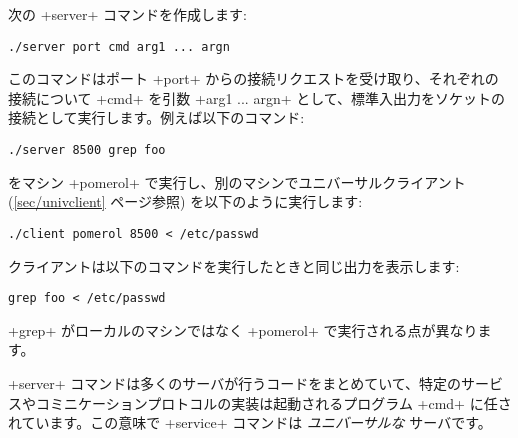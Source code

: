 次の \ml+server+ コマンドを作成します:
%
\begin{lstlisting}
./server port cmd arg1 ... argn
\end{lstlisting}
%
このコマンドはポート \ml+port+ からの接続リクエストを受け取り、それぞれの接続について \ml+cmd+ を引数 \ml+arg1 ... argn+ として、標準入出力をソケットの接続として実行します。例えば以下のコマンド:
%
\begin{lstlisting}
./server 8500 grep foo
\end{lstlisting}
%
をマシン \ml+pomerol+ で実行し、別のマシンでユニバーサルクライアント (\ref{sec/univclient} ページ参照) を以下のように実行します:
%
\begin{lstlisting}
./client pomerol 8500 < /etc/passwd
\end{lstlisting}
%
クライアントは以下のコマンドを実行したときと同じ出力を表示します:
%
\begin{lstlisting}
grep foo < /etc/passwd
\end{lstlisting}
%
\ml+grep+ がローカルのマシンではなく \ml+pomerol+ で実行される点が異なります。

\ml+server+ コマンドは多くのサーバが行うコードをまとめていて、特定のサービスやコミニケーションプロトコルの実装は起動されるプログラム \ml+cmd+ に任されています。この意味で \ml+service+ コマンドは \emph{ユニバーサルな} サーバです。

